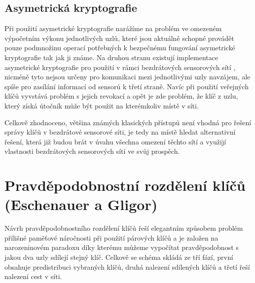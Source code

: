 \documentclass[11pt,final,twoside]{fithesis2}
\begin{document}
\subsection{Asymetrická kryptografie} Při použití asymetrické kryptografie narážíme na problém ve omezeném výpočetním výkonu jednotlivých uzlů, 
které jsou aktuálně schopné provádět pouze podmnožinu operací potřebných k bezpečnému fungování asymetrické kryptografie tak jak ji známe.
Na druhou stranu existují implementace asymetrické kryptografie pro použití v rámci bezdrátových sensorových sítí \cite{Watro2004}, nicméně 
tyto nejsou určeny pro komunikaci mezi jednotlivými uzly navzájem, ale spíše pro zasílání informací od sensorů k třetí straně. 
Navíc při použití veřejných klíčů vyvstává problém s jejich revokací a opět je zde problém, že klíč z uzlu, který získá útočník může být použit 
na kterémkoliv místě v síti.

Celkově zhodnoceno, většina známých klasických přístupů není vhodná pro řešení správy klíčů v bezdrátové sensorové síti, je tedy na místě hledat alternativní řešení,
která již budou brát v úvahu všechna omezení těchto sítí a využijí vlastnosti bezdrátových sensorových sítí ve svůj prospěch.

\section{Pravděpodobnostní rozdělení klíčů (Eschenauer a Gligor)} \label{sec:Eschenauer}
Návrh pravděpodobnostního rozdělení klíčů \cite{Eschenauer2002} řeší elegantním způsobem problém přílišné paměťové náročnosti při použití párových klíčů a je 
založen na narozeninovém paradoxu díky kterému můžeme vypočítat pravděpodobnost s jakou dva uzly sdílejí stejný klíč. 
Celkově se schéma skládá ze tří fází, první obsahuje predistribuci vybraných klíčů, druhá nalezení sdílených klíčů a třetí řeší nalezení cest v síti.
\end{document}

